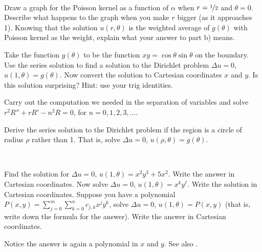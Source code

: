 \begin{exercise}
{\ }
\begin{tasks}
\task Draw a graph for the Poisson kernel as a function of $\alpha$
when $r=\nicefrac{1}{2}$ and $\theta = 0$.
\task Describe what happens to the graph when you make $r$ bigger (as it
approaches 1).
\task Knowing that the solution $u(r,\theta)$ is the weighted average
of $g(\theta)$ with Poisson kernel as the weight, explain what your answer
to part b) means.
\end{tasks}
\end{exercise}

\begin{exercise} \label{exercise:dirichproblemxy}
Take the function $g(\theta)$ to be the function $xy = \cos \theta \sin
\theta$ on the boundary.  Use the series solution to find a solution
to the Dirichlet problem $\Delta u = 0$, $u(1,\theta) = g(\theta)$.  Now
convert the solution to Cartesian coordinates $x$ and $y$.  Is this
solution surprising?  Hint: use your trig identities.
\end{exercise}

\begin{exercise}
Carry out the computation we needed in the separation of variables and solve
$r^2 R'' + r R' - n^2 R = 0$, for $n=0,1,2,3,\ldots$.
\end{exercise}

\begin{exercise}[challenging]
Derive the series solution to the Dirichlet problem if the region is a
circle of radius $\rho$ rather
than 1.
That is, solve $\Delta u = 0$, $u(\rho,\theta) = g(\theta)$.
\end{exercise}

\begin{exercise}[challenging]
{\ }
\begin{tasks}
\task
Find the solution for
$\Delta u = 0$, $u(1,\theta) = x^2y^3 + 5 x^2$.  Write the answer in Cartesian coordinates.
\task
Now solve
$\Delta u = 0$, $u(1,\theta) = x^k y^\ell$.
Write the solution in Cartesian coordinates.
\task
Suppose you have a polynomial $P(x,y) = \sum_{j=0}^m \sum_{k=0}^n c_{j,k}
x^j y^k$, solve $\Delta u = 0$, $u(1,\theta) = P(x,y)$ (that is, write down
the formula for the answer).  Write the answer
in Cartesian coordinates.
\end{tasks}
Notice the answer is again a polynomial in $x$ and $y$.
See also .
\end{exercise}

